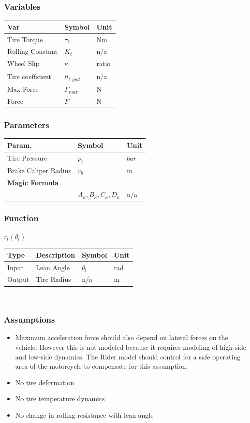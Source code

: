 \documentclass[../SimBALink.tex]{subfiles}
\begin{document}
\subsubsection{Variables}
	\begin{tabular}{ l | l | l  }
		Var					&	Symbol		&	Unit		\\	\hline
		Tire Torque			&	$\tau_t$	&	 Nm \\
		Rolling Constant	&	$K_t$		& 	n/a \\
		Wheel Slip			&	$\kappa$ 	&	ratio \\
		Tire coefficient 	& $\mu_{t,gnd}$ &	n/a \\
		Max Force 			&	$F_{max}$	&	N \\
		Force 				&	$F$	&	N \\
	\end{tabular}
\subsubsection{Parameters}
	\begin{tabular}{ l | l | l  }
		Param.					&	Symbol		&	Unit		\\	\hline
		Tire Pressure		&	$p_t$		&	 $bar$ \\
		Brake Caliper Radius &	$r_b$		&	m \\		
		\textbf{Magic Formula}\\		&	$A_{\kappa},B_{\kappa},C_{\kappa},D_{\kappa}$		&	 n/a \\
	\end{tabular}
	
\subsubsection{Function}
$r_t(\theta_l)$ \\
	\begin{tabular}{ l | l | l | l }
		Type				& Description		&	Symbol		&	Unit		\\	\hline
		Input 				& Lean Angle		&	$\theta_l$  & 	rad		\\
		Output 				& Tire Radius		&	n/a			&	m
	\end{tabular} \\

\subsubsection{Assumptions}
\begin{itemize}
  \item Maximum acceleration force should also depend on lateral forces on the vehicle. However this is not modeled because it requires modeling of high-side and low-side dynamics. The Rider model should control for a safe operating area of the motorcycle to compensate for this assumption. 
  \item No tire deformation
  \item No tire temperature dynamics
  \item No change in rolling resistance with lean angle 
\end{itemize}
\end{document}
